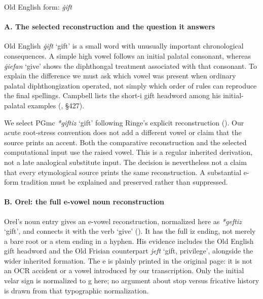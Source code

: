 \documentclass[
  british,
  a4paper,
]{article}
\providecommand{\Recon}[1]{\emph{*#1}}
\begin{document}
Old English form: \emph{ġift}

\paragraph{A. The selected reconstruction and the question it
answers}\label{a.-the-selected-reconstruction-and-the-question-it-answers}

Old English \emph{ġift} `gift' is a small word with unusually important
chronological consequences. A simple high vowel follows an initial
palatal consonant, whereas \emph{ġiefan} `give' shows the diphthongal
treatment associated with that consonant. To explain the difference we
must ask which vowel was present when ordinary palatal diphthongization
operated, not simply which order of rules can reproduce the final
spellings. Campbell lists the short-i gift headword among his
initial-palatal examples (, §427).

We select PGmc \Recon{giftiz} `gift' following Ringe's explicit
reconstruction (). Our acute
root-stress convention does not add a different vowel or claim that the
source prints an accent. Both the comparative reconstruction and the
selected computational input use the raised vowel. This is a regular
inherited derivation, not a late analogical substitute input. The
decision is nevertheless not a claim that every etymological source
prints the same reconstruction. A substantial e-form tradition must be
explained and preserved rather than suppressed.

\paragraph{B. Orel: the full e-vowel noun
reconstruction}\label{b.-orel-the-full-e-vowel-noun-reconstruction}

Orel's noun entry gives an e-vowel reconstruction, normalized here as
\Recon{geftiz} `gift', and connects it with the verb `give'
(). It has the full iz ending,
not merely a bare root or a stem ending in a hyphen. His evidence
includes the Old English gift headword and the Old Frisian counterpart
\emph{jeft} `gift, privilege', alongside the wider inherited formation.
The e is plainly printed in the original page: it is not an OCR accident
or a vowel introduced by our transcription. Only the initial velar sign
is normalized to g here; no argument about stop versus fricative history
is drawn from that typographic normalization.
\end{document}
